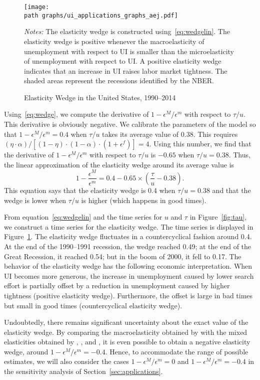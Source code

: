 \documentclass[letterpaper,12pt,leqno]{article}
\def\path{../}
\newcommand{\pre}[1]{\left( #1 \right)}
\newcommand{\brk}[1]{\left[ #1 \right]}
\newcommand{\fignotes}[1]{\centering\parbox[c]{\textwidth}{\footnotesize \textit{Notes:} #1}}
\def \e{{\epsilon}}
\def \a{{\alpha}}
\begin{document}
\begin{figure}[t] \centering
\texttt{[image: \\path graphs/ui\_applications\_graphs\_aej.pdf]}
\caption{Elasticity Wedge in the United States, 1990--2014}
\fignotes{The elasticity wedge is constructed using~\eqref{eq:wedgelin}. The elasticity wedge is positive whenever the macroelasticity of unemployment with respect to UI is smaller than the microelasticity of unemployment with respect to UI. A positive elasticity wedge indicates that an increase in UI raises labor market tightness. The shaded areas represent the recessions identified by the NBER.} 
\label{fig:wedge}\end{figure}

Using~\eqref{eq:wedge}, we compute the derivative of $1-\e^{M}/\e^{m}$ with respect to $\tau/u$. This derivative is obviously negative. We calibrate the parameters of the model so that $1-\e^{M}/\e^{m}=0.4$ when $\tau/u$ takes its average value of 0.38. This requires $\pre{\eta\cdot \a}/\brk{(1-\eta) \cdot (1-\a) \cdot (1+\e^f)} = 4$. Using this number, we find that the derivative of $1-\e^{M}/\e^{m}$ with respect to $\tau/u$ is $-0.65$ when $\tau/u=0.38$. Thus, the linear approximation of the elasticity wedge around its average value is
\begin{equation}
1-\frac{\e^{M}}{\e^{m}}= 0.4 - 0.65\times \pre{\frac{\tau}{u}-0.38}.
\label{eq:wedgelin}\end{equation}
This equation says that the elasticity wedge is 0.4 when $\tau/u=0.38$ and that the wedge is lower when $\tau/u$ is higher (which happens in good times).

From equation~\eqref{eq:wedgelin} and the time series for $u$ and $\tau$ in Figure~\ref{fig:tau}, we construct a time series for the elasticity wedge. The time series is displayed in Figure~\ref{fig:wedge}. The elasticity wedge fluctuates in a countercyclical fashion around 0.4. At the end of the 1990--1991 recession, the wedge reached 0.49; at the end of the Great Recession, it reached 0.54; but in the boom of 2000, it fell to 0.17. The behavior of the elasticity wedge has the following economic interpretation. When UI becomes more generous, the increase in unemployment caused by lower search effort is partially offset by a reduction in unemployment caused by higher tightness (positive elasticity wedge). Furthermore, the offset is large in bad times but small in good times (countercyclical elasticity wedge).

Undoubtedly, there remains significant uncertainty about the exact value of the elasticity wedge. By comparing the macroelasticity obtained by \citet{HKM13} with the mixed elasticities obtained by \citet{R11}, \citet{V14}, and \citet{FV13}, it is even possible to obtain a negative elasticity wedge, around $1-\e^{M}/\e^{m}=-0.4$. Hence, to accommodate the range of possible estimates, we will also consider the cases $1-\e^{M}/\e^{m}=0$ and $1-\e^M/\e^m=-0.4$ in the sensitivity analysis of Section~\ref{sec:applications}.
\end{document}

